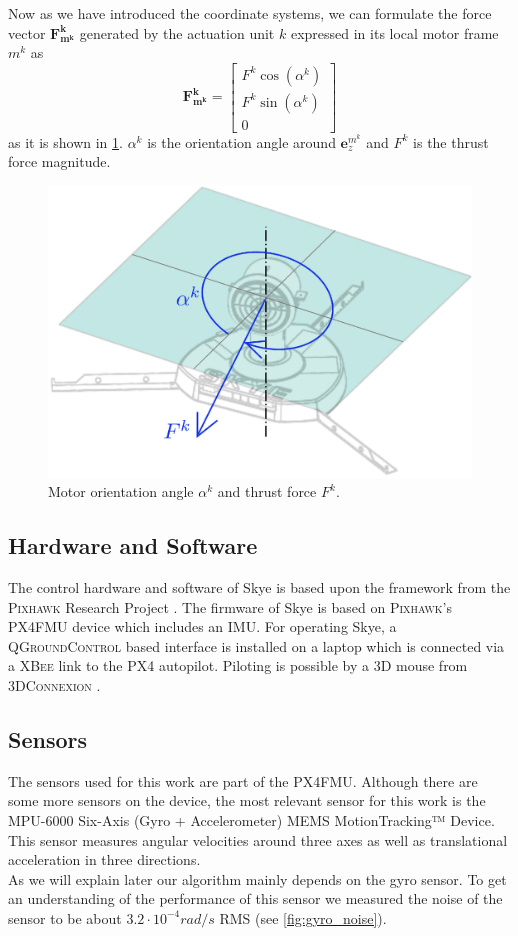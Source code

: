 Now as we have introduced the coordinate systems, we can formulate the force vector $\mathbf{F_{m^k}^k}$ generated by the actuation unit $k$ expressed in its local motor frame $m^k$ as
\begin{equation}
\mathbf{F_{m^k}^k} = 
\left[\begin{array}{c}
F^k \cos(\alpha^k) \\
F^k \sin(\alpha^k) \\
0
\end{array}\right]
\end{equation}
as it is shown in \cref{fig:motor_force}.
$\alpha^k$ is the orientation angle around $\mathbf{e}^{m^k}_z$ and $F^k$ is the thrust force magnitude.

\begin{figure}[hbtp]
\centering
\includegraphics[width=.4\linewidth]{images/intro/motor_force.eps}
\caption{Motor orientation angle $\alpha^k$ and thrust force $F^k$.}
\label{fig:motor_force}
\end{figure}

\subsection{Hardware and Software}
The control hardware and software of Skye is based upon the framework from the \textsc{Pixhawk} Research Project \citep{pixhawk}.
The firmware of Skye is based on \textsc{Pixhawk}'s PX4FMU device which includes an IMU.
For operating Skye, a \textsc{QGroundControl} based interface is installed on a laptop
which is connected via a \textsc{XBee} link to the PX4 autopilot.
Piloting is possible by a 3D mouse from \textsc{3DConnexion} \citep[see][]{Krebs2012}.

\subsection{Sensors}
The sensors used for this work are part of the PX4FMU.
Although there are some more sensors on the device, the most relevant sensor for this work is the MPU-6000 Six-Axis (Gyro + Accelerometer) MEMS MotionTracking™ Device.
This sensor measures angular velocities around three axes as well as translational acceleration in three directions. \\
As we will explain later our algorithm mainly depends on the gyro sensor.
To get an understanding of the performance of this sensor we measured the noise of the sensor to be about $3.2 \cdot 10^{-4}rad/s$ RMS (see \cref{fig:gyro_noise}).


